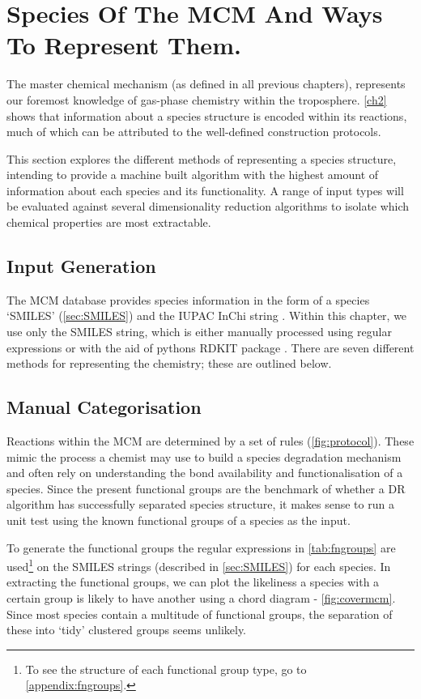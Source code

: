 \section{Species Of The MCM And Ways To Represent Them.}\label{sec:drinput}
The master chemical mechanism (as defined in all previous chapters), represents our foremost knowledge of gas-phase chemistry within the troposphere.  \autoref{ch2} shows that information about a species structure is encoded within its reactions, much of which can be attributed to the well-defined construction protocols.

This section explores the different methods of representing a species structure, intending to provide a machine built algorithm with the highest amount of information about each species and its functionality. A range of input types will be evaluated against several dimensionality reduction algorithms to isolate which chemical properties are most extractable.

\subsection{Input Generation}
The MCM database provides species information in the form of a species `SMILES' (\autoref{sec:SMILES}) and the IUPAC InChi string \citep{inchi}. Within this chapter, we use only the SMILES string, which is either manually processed using regular expressions or with the aid of pythons RDKIT package \citep{rdkit}. There are seven different methods for representing the chemistry; these are outlined below.


\subsection{Manual Categorisation}
Reactions within the MCM are determined by a set of rules (\autoref{fig:protocol}). These mimic the process a chemist may use to build a species degradation mechanism and often rely on understanding the bond availability and functionalisation of a species. Since the present functional groups are the benchmark of whether a DR algorithm has successfully separated species structure, it makes sense to run a unit test using the known functional groups of a species as the input.

To generate the functional groups the regular expressions in \autoref{tab:fngroups} are used\footnote{To see the structure of each functional group type, go to \autoref{appendix:fngroups}.} on the SMILES strings (described in \autoref{sec:SMILES}) for each species. In extracting the functional groups, we can plot the likeliness a species with a certain group is likely to have another using a chord diagram - \autoref{fig:covermcm}. Since most species contain a multitude of functional groups, the separation of these into `tidy' clustered groups seems unlikely.



